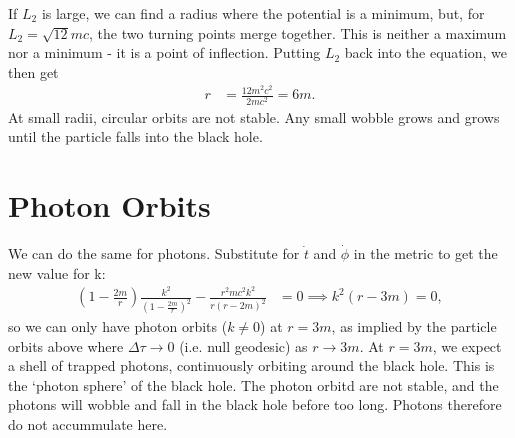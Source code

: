 \documentclass[a4paper, 11pt, normalem]{report}
\begin{document}
If $L_2$ is large, we can find a radius where the potential is a minimum, but, for $L_2=\sqrt{12}mc$, the two turning points merge together. 
This is neither a maximum nor a minimum - it is a point of inflection. 
Putting $L_2$ back into the equation, we then get
\begin{align}
    r &= \frac{12m^2c^2}{2mc^2} = 6m.
\end{align}
At small radii, circular orbits are not stable. 
Any small wobble grows and grows until the particle falls into the black hole. 
\begin{figure}[H]
    \centering
\end{figure}

\section{Photon Orbits}
We can do the same for photons.
Substitute for $\dot{t}$ and $\dot{\phi}$ in the metric to get the new value for k:
\begin{align}
    \left(1-\frac{2m}{r}\right)\frac{k^2}{\left(1-\frac{2m}{r}\right)^2} - \frac{r^2mc^2k^2}{r\left(r-2m\right)^2} &= 0 \implies k^2(r-3m) = 0, 
\end{align}
so we can only have photon orbits ($k\neq0$) at $r=3m$, as implied by the particle orbits above where $\Delta\tau\to0$ (i.e. null geodesic) as $r\to3m$.
At $r=3m$, we expect a shell of trapped photons, continuously orbiting around the black hole. 
This is the `photon sphere' of the black hole. 
The photon orbitd are not stable, and the photons will wobble and fall in the black hole before too long. 
Photons therefore do not accummulate here. 

\newpage
\end{document}

